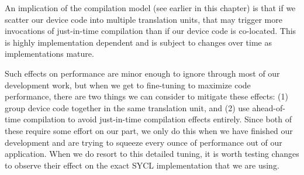 An implication of the compilation model (see earlier in this chapter) is that if we scatter our device code into multiple translation units, that may trigger more invocations of just-in-time compilation than if our device code is co-located. This is highly implementation dependent and is subject to changes over time as implementations mature.\par

Such effects on performance are minor enough to ignore through most of our development work, but when we get to fine-tuning to maximize code performance, there are two things we can consider to mitigate these effects: (1) group device code together in the same translation unit, and (2) use ahead-of-time compilation to avoid just-in-time compilation effects entirely. Since both of these require some effort on our part, we only do this when we have finished our development and are trying to squeeze every ounce of performance out of our application. When we do resort to this detailed tuning, it is worth testing changes to observe their effect on the exact SYCL implementation that we are using.\par











































